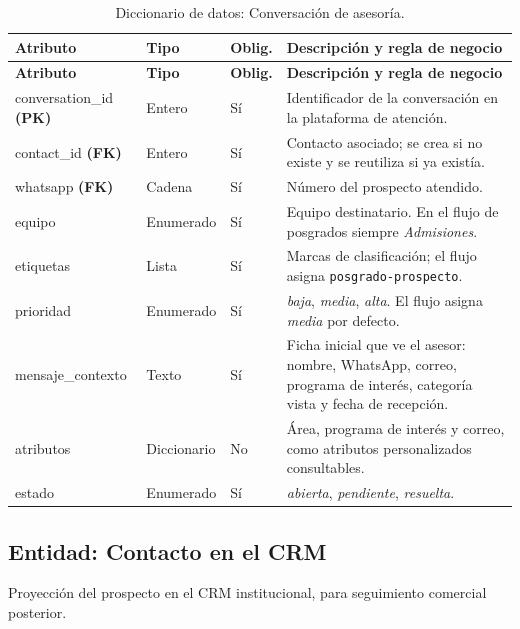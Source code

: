 \documentclass[12pt,a4paper]{report}
\newcommand{\tablacompacta}{\setstretch{1.1}\small}
\newcommand{\cabecera}[1]{\rowcolor{filacabecera}#1}
\begin{document}
{\tablacompacta
\begin{longtable}{p{3.1cm}p{2.2cm}p{1.3cm}p{6.0cm}}
\caption{Diccionario de datos: Conversación de asesoría.}\label{tab:dd-conversacion}\\
\toprule
\cabecera{\textbf{Atributo}} & \textbf{Tipo} & \textbf{Oblig.} & \textbf{Descripción y regla de negocio} \\
\midrule
\endfirsthead
\toprule
\textbf{Atributo} & \textbf{Tipo} & \textbf{Oblig.} & \textbf{Descripción y regla de negocio} \\
\midrule
\endhead
\bottomrule
\endfoot
conversation\_id \textbf{(PK)} & Entero & Sí & Identificador de la conversación en la plataforma de atención. \\
contact\_id \textbf{(FK)} & Entero & Sí & Contacto asociado; se crea si no existe y se reutiliza si ya existía. \\
whatsapp \textbf{(FK)} & Cadena & Sí & Número del prospecto atendido. \\
equipo & Enumerado & Sí & Equipo destinatario. En el flujo de posgrados siempre \textit{Admisiones}. \\
etiquetas & Lista & Sí & Marcas de clasificación; el flujo asigna \texttt{posgrado-prospecto}. \\
prioridad & Enumerado & Sí & \textit{baja}, \textit{media}, \textit{alta}. El flujo asigna \textit{media} por defecto. \\
mensaje\_contexto & Texto & Sí & Ficha inicial que ve el asesor: nombre, WhatsApp, correo, programa de interés, categoría vista y fecha de recepción. \\
atributos & Diccionario & No & Área, programa de interés y correo, como atributos personalizados consultables. \\
estado & Enumerado & Sí & \textit{abierta}, \textit{pendiente}, \textit{resuelta}. \\
\end{longtable}}

\subsection{Entidad: Contacto en el CRM}

Proyección del prospecto en el CRM institucional, para seguimiento comercial posterior.
\end{document}
